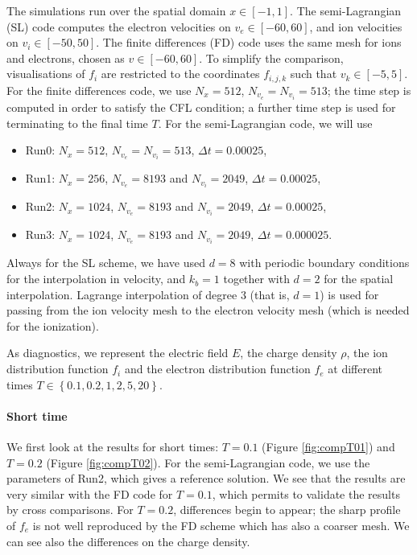 \documentclass{article}
\numberwithin{equation}{section}
\begin{document}
The simulations run over the spatial domain $x \in [-1,1]$. The semi-Lagrangian (SL) code computes the electron velocities on $v_e \in [-60, 60]$, and ion velocities on $v_i \in [-50, 50]$. The finite differences (FD) code uses the same mesh for ions and electrons, chosen as $v\in[-60,60]$. To simplify the comparison, visualisations of $f_i$ are restricted to the coordinates $f_{i,j,k}$ such that $v_k \in [-5,5]$.
For the finite differences code, we use $N_x=512$, $N_{v_e}=N_{v_i}=513$; the time step is computed in order to satisfy the CFL condition; a further time step is used for terminating to the final time $T$.  
For the semi-Lagrangian code, we will use

\begin{itemize}
\item Run0: $N_x=512$, $N_{v_e}=N_{v_i}=513$, $\Delta t = 0.00025$,
\item Run1: $N_x=256$, $N_{v_e}=8193$ and $N_{v_i}=2049$, $\Delta t = 0.00025$,
\item Run2: $N_x=1024$, $N_{v_e}=8193$ and $N_{v_i}=2049$, $\Delta t = 0.00025$,
\item Run3: $N_x=1024$, $N_{v_e}=8193$ and $N_{v_i}=2049$, $\Delta t = 0.000025$.
\end{itemize}

Always for the SL scheme, we have used $d=8$ with periodic boundary conditions for the interpolation in velocity, and $k_b=1$ together with $d=2$ for the spatial interpolation.
Lagrange interpolation of degree $3$  (that is, $d=1$) is used for passing from the ion velocity mesh to the electron velocity mesh (which is needed for the ionization).

As diagnostics, we represent the electric field $E$, the charge density $\rho$, the ion distribution function $f_i$ and the electron distribution function $f_e$ at different times $T\in \left\{0.1,0.2,1,2,5,20\right\}$.

\paragraph{Short time}

We first look at the results for short times: $T=0.1$ (Figure \ref{fig:compT01}) and $T=0.2$ (Figure \ref{fig:compT02}). For the semi-Lagrangian code, we use the parameters of Run2, which gives a reference solution.
We see that the results are very similar with the FD code for $T=0.1$, which permits to validate the results by cross comparisons. For $T=0.2$, differences begin to appear; the sharp profile of $f_e$ is not well
reproduced by the FD scheme which has also a coarser mesh. We can see also the differences on the charge density.
\end{document}
